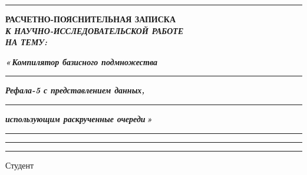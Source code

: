 \documentclass[14pt, russian]{scrartcl}
\begin{document}
\begin{titlepage}
\vspace*{-16pt}
\hspace{25pt}\rule{0.875\textwidth}{0.4pt}

\vspace{3em}

\begin{center}
\Large \bf{РАСЧЕТНО-ПОЯСНИТЕЛЬНАЯ ЗАПИСКА\\\textbf{\textit{К НАУЧНО-ИССЛЕДОВАТЕЛЬСКОЙ РАБОТЕ\\НА ТЕМУ:}} \\}
\end{center}

\vspace*{-6ex}
\begin{center}
\Large
\textit{\textbf{«\,Компилятор базисного подмножества}}\par
\vspace*{-3ex}
\rule{0.9\textwidth}{1.2pt}

\vspace*{0.55ex}
\textit{\textbf{Рефала-5 с представлением данных,}}\par
\vspace*{-3ex}
\rule{0.9\textwidth}{1.2pt}

\vspace*{0.55ex}
\textit{\textbf{использующим раскрученные очереди\,»}}\par
\vspace*{-3ex}
\rule{0.9\textwidth}{1.2pt}

\vspace*{-0.2ex}
\rule{0.9\textwidth}{1.2pt}

\vspace*{-0.2ex}
\rule{0.9\textwidth}{1.2pt}
\end{center}

\vspace{\fill}

\newlength{\ML}

\noindent Студент \underline{\hspace{1.5cm}} \hfill \underline{\hspace{4cm}}\quad
\underline{\hspace{4cm}}


\end{titlepage}
\end{document}
